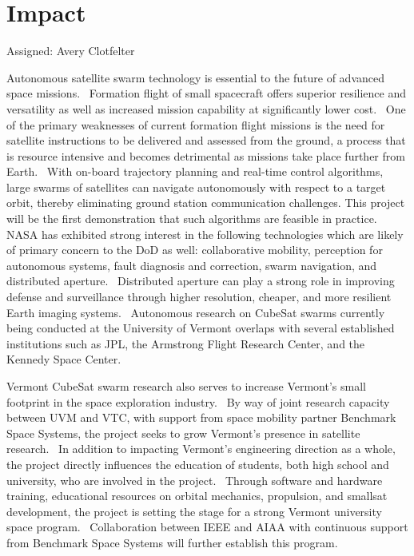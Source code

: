\section{Impact}
Assigned: Avery Clotfelter

Autonomous satellite swarm technology is essential to the future of
advanced space missions.  Formation flight of small spacecraft offers
superior resilience and versatility as well as increased mission
capability at significantly lower cost.  One of the primary weaknesses
of current formation flight missions is the need for satellite
instructions to be delivered and assessed from the ground, a process
that is resource intensive and becomes detrimental as missions take
place further from Earth.  With on-board trajectory planning and real-time control algorithms, large swarms of satellites can navigate autonomously with respect to a target orbit, thereby eliminating ground station communication challenges.  This project will be the first demonstration that such algorithms are feasible in practice.  NASA has exhibited strong interest in the
following technologies which are likely of primary concern to the DoD
as well: collaborative mobility, perception for autonomous systems,
fault diagnosis and correction, swarm navigation, and distributed
aperture.  Distributed aperture can play a strong role in improving
defense and surveillance through higher resolution, cheaper, and more
resilient Earth imaging systems.  Autonomous research on CubeSat
swarms currently being conducted at the University of Vermont overlaps
with several established institutions such as JPL, the Armstrong
Flight Research Center, and the Kennedy Space Center. 

Vermont CubeSat swarm research also serves to increase Vermont’s small
footprint in the space exploration industry.  By way of joint research
capacity between UVM and VTC, with support from space mobility partner
Benchmark Space Systems, the project seeks to grow Vermont’s presence
in satellite research.  In addition to impacting Vermont’s engineering
direction as a whole, the project directly influences the education of
students, both high school and university, who are involved in the
project.  Through software and hardware training, educational
resources on orbital mechanics, propulsion, and smallsat development,
the project is setting the stage for a strong Vermont university space
program.  Collaboration between IEEE and AIAA with continuous support
from Benchmark Space Systems will further establish this program.

